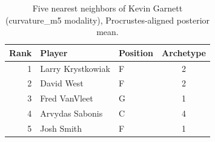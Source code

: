 \begin{table}[htbp]
  \centering\small
  \begin{tabular}{rllc}
    \toprule
    Rank & Player & Position & Archetype \\
    \midrule
    1 & Larry Krystkowiak & F & 2 \\
    2 & David West & F & 2 \\
    3 & Fred VanVleet & G & 1 \\
    4 & Arvydas Sabonis & C & 4 \\
    5 & Josh Smith & F & 1 \\
    \bottomrule
  \end{tabular}
  \caption{Five nearest neighbors of Kevin Garnett (curvature_m5 modality), Procrustes-aligned posterior mean.}
  \label{tab:Kevin_Garnett_neighbors_curvature_m5}
\end{table}

